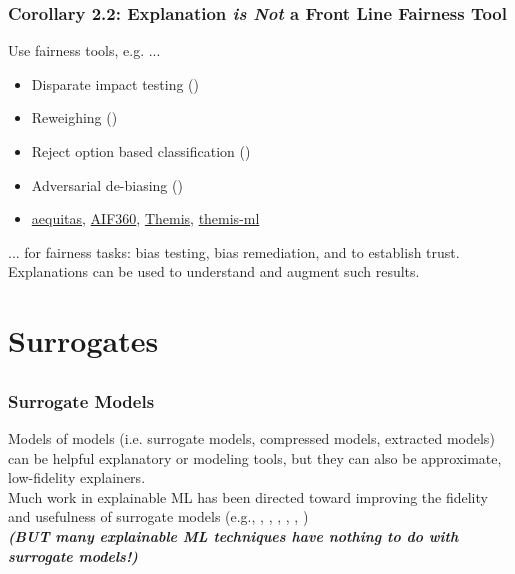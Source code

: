 \documentclass[11pt,
               aspectratio=169,
               hyperref={colorlinks}
               ]{beamer}
\begin{document}
	\begin{frame}[label={not_frontline}]
	
		\frametitle{\textbf{Corollary 2.2}: Explanation \textbf{\textit{is Not}} a Front Line Fairness Tool}
		\large
		Use fairness tools, e.g. ...
		\vspace{5pt}
		\begin{itemize}\normalsize
			\item Disparate impact testing (\citet{feldman2015certifying})
			\item Reweighing (\citet{kamiran2012data})
			\item Reject option based classification (\citet{kamiran2012decision})
			\item Adversarial de-biasing (\citet{zhang2018mitigating})
			\item \href{https://github.com/dssg/aequitas}{aequitas}, \href{https://github.com/IBM/AIF360}{AIF360}, \href{https://github.com/LASER-UMASS/Themis}{Themis}, \href{https://github.com/cosmicBboy/themis-ml}{themis-ml}
		\end{itemize}
		\vspace{5pt}
		... for fairness tasks: bias testing, bias remediation, and to establish trust.\\
		\vspace{10pt}
		Explanations can be used to understand and augment such results.
		
	\end{frame}
	
	\section{Surrogates}

	\subsection*{} %

	\begin{frame}
	
		\frametitle{Surrogate Models}
		\large
		Models of models (i.e. surrogate models, compressed models, extracted models) can be helpful explanatory or modeling tools, but they can also be approximate, low-fidelity explainers.\\
		\vspace{10pt}
		Much work in explainable ML has been directed toward improving the fidelity and usefulness of surrogate models (e.g., \citet{dt_surrogate2}, \citet{viper}, \citet{dt_surrogate1}, \citet{lime-sup}, \citet{anchors}, \citet{wf_xnn})\\
		\vspace{10pt}
		\textbf{\textit{(BUT many explainable ML techniques have nothing to do with surrogate models!)}}
		
	\end{frame}
	
\end{document}
